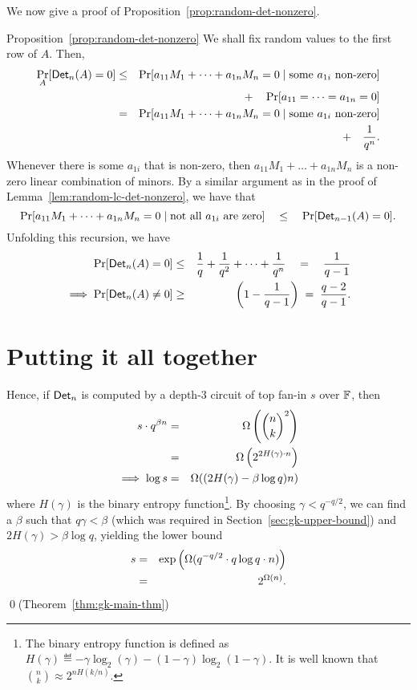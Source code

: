 \documentclass[12pt]{report}
\begin{document}
We now give a proof of Proposition~\ref{prop:random-det-nonzero}. 

\begin{proofof}{Proposition~\ref{prop:random-det-nonzero}}
We shall fix random values to the first row of $A$. Then,
\begin{eqnarray*}
\Pr_{A}[\mathsf{Det}_n(A) = 0] & \leq & \Pr[a_{11} M_1 + \dots + a_{1n} M_n = 0 \;|\;\text{some $a_{1i}$ non-zero}]\\
& &\quad + \quad \Pr[a_{11}=\dots = a_{1n} = 0]\\
 & = & \Pr[a_{11} M_1 + \dots + a_{1n} M_n = 0 \;|\;\text{some $a_{1i}$ non-zero}]\\
 & & \quad + \quad \frac{1}{q^n}.
\end{eqnarray*}
Whenever there is some $a_{1i}$ that is non-zero, then $a_{11}M_1 +
\dots + a_{1n}M_n$ is a non-zero linear combination of minors. By a similar argument as in the proof of Lemma~\ref{lem:random-lc-det-nonzero}, we have that
$$
\Pr[a_{11} M_1 + \dots + a_{1n}M_n = 0\;|\;\text{not all $a_{1i}$ are zero}] \quad \leq \quad \Pr[\mathsf{Det}_{n-1}(A) = 0].
$$
Unfolding this recursion, we have
\begin{eqnarray*}
\Pr[\mathsf{Det}_n(A) = 0] & \leq & \frac{1}{q} + \frac{1}{q^2} + \dots + \frac{1}{q^n} \quad=\quad \frac{1}{q-1}\\
\implies \Pr[\mathsf{Det}_n(A) \neq 0] & \geq & \left(1 - \frac{1}{q-1}\right) \;=\; \frac{q-2}{q-1}.
\end{eqnarray*}
\end{proofof}



\section{Putting it all together}

Hence, if $\mathsf{Det}_n$ is computed by a depth-3 circuit of top fan-in $s$ over $\mathbb{F}$, then 
\begin{eqnarray*}
s \cdot q^{\beta n} & = &  \Omega\left(\binom{n}{k}^2\right)\\
 & = & \Omega\left(2^{2H(\gamma)\cdot n}\right)\\
\implies \log s & = & \Omega((2H(\gamma) - \beta \log q)n)
\end{eqnarray*}
where $H(\gamma)$ is the binary entropy function\footnote{The binary entropy function is defined as $H(\gamma) \eqdef -\gamma \log_2(\gamma) - (1-\gamma)\log_2(1-\gamma)$. It is well known that $\binom{n}{k} \approx 2^{nH(k/n)}$. }. 
By choosing $\gamma < q^{-q/2}$, we can find a $\beta$ such that
$q\gamma < \beta$ (which was required in
Section~\ref{sec:gk-upper-bound}) and $2H(\gamma) > \beta \log q$,
yielding the lower bound  
\begin{eqnarray*}
  s &=& \exp\left(\Omega(q^{-q/2}\cdot q\log q \cdot n)\right) \\
  & =& 2^{\Omega(n)}.
\end{eqnarray*}
\qed (Theorem~\ref{thm:gk-main-thm})
\end{document}
